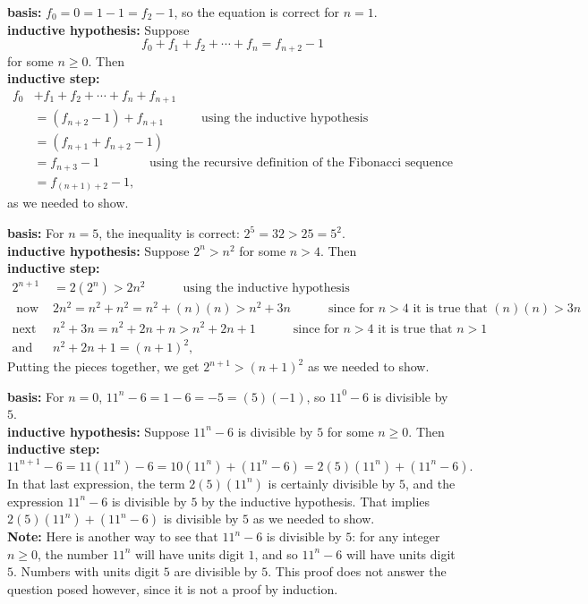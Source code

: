 \begin{Solution}{16.3}
{\bfseries basis:} $f_{0} = 0 = 1-1 = f_{2}-1$, so the equation is correct for $n=1$.\\
{\bfseries inductive hypothesis:} Suppose 
\[f_{0}+ f_{1} + f_{2}+\cdots+f_{n} = f_{n+2} - 1\] for some $n\geq 0$. Then\\
{\bfseries inductive step:} 
\begin{align*}
f_{0}&+ f_{1} + f_{2}+\cdots+f_{n} + f_{n+1} \\
&= (f_{n+2} - 1)+f_{n+1}\qquad\quad\text{using the inductive hypothesis}\\
&= (f_{n+1} + f_{n+2} - 1)\\
&= f_{n+3} -1 \qquad\qquad\text{using the recursive definition of the Fibonacci sequence}\\
&= f_{(n+1)+2} - 1,
\end{align*}
as we needed to show.
\end{Solution}


\begin{Solution}{16.4}
{\bfseries basis:} For $n=5$, the inequality is correct: $2^5 = 32 > 25 = 5^2$.\\
{\bfseries inductive hypothesis:} Suppose $2^n > n^2$ for some $n>4$. Then\\
{\bfseries inductive step:} 
\begin{align*}
2^{n+1} & =2 (2^n) >2n^2\qquad\quad\text{using the inductive hypothesis} \\
\text{ now }& 2n^{2}= n^2 + n^2 = n^2 + (n)(n)> n^2 + 3n\qquad\quad\text{since  for } n>4 \text { it is true that } (n)(n) > 3n \\
\text{next }&n^{2}+3n= n^2 +2n + n > n^2 + 2n + 1\qquad\quad\text{since for } n>4  \text { it is true that } n >1\\
\text{and }& n^{2}+ 2n + 1= (n+1)^2,
\end{align*}
Putting the pieces together, we get $2^{n+1}> (n+1)^{2}$ as we needed to show.
\end{Solution}

\begin{Solution}{16.5}
{\bfseries basis:} For $n=0$, $11^n - 6 = 1-6 = -5 = (5)(-1)$, so $11^0-6$ is divisible by $5$.\\
{\bfseries inductive hypothesis:} Suppose $11^n-6$ is divisible by $5$ for some $n\geq 0$. Then\\
{\bfseries inductive step:} 
\[
11^{n+1} - 6 = 11(11^n) - 6 =10(11^n) +(11^n-6) = 2(5)(11^n) + (11^n -6).
\]
In that last expression, the term $2(5)(11^n)$ is certainly divisible by $5$, and the expression  $11^n-6$ is 
divisible by $5$ by the inductive hypothesis. That implies $2(5)(11^n) + (11^n -6)$ is divisible by $5$ as we needed to show.\\
{\bfseries Note:} Here is another way to see that $11^n-6$ is divisible by $5$: for any integer $n\geq 0$, the number
$11^n$ will have units digit $1$, and so $11^n - 6$ will have units digit $5$. Numbers with units digit $5$ are divisible by $5$. This proof does not answer the question posed however, since it is not a proof by induction.
\end{Solution}


